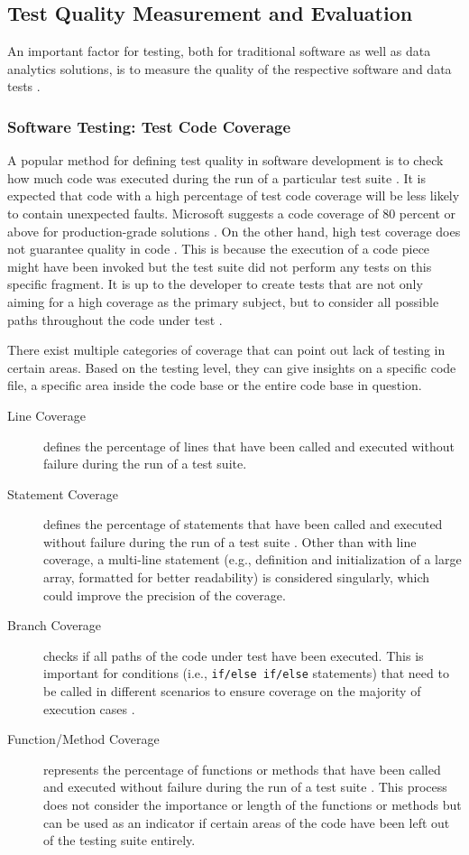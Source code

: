 \subsection{Test Quality Measurement and Evaluation}
An important factor for testing, both for traditional software as well as data analytics solutions, is to measure the quality of the respective software and data tests \cite[30]{Brader2012}.

\subsubsection{Software Testing: Test Code Coverage}
A popular method for defining test quality in software development is to check how much code was executed during the run of a particular test suite \cite[30]{Brader2012}. It is expected that code with a high percentage of test code coverage will be less likely to contain unexpected faults. Microsoft suggests a code coverage of 80 percent or above for production-grade solutions \cite[30]{Brader2012}. On the other hand, high test coverage does not guarantee quality in code \cite[8]{Heckman2014}. This is because the execution of a code piece might have been invoked but the test suite did not perform any tests on this specific fragment. It is up to the developer to create tests that are not only aiming for a high coverage as the primary subject, but to consider all possible paths throughout the code under test \cite[9]{Heckman2014}.

There exist multiple categories of coverage that can point out lack of testing in certain areas. Based on the testing level, they can give insights on a specific code file, a specific area inside the code base or the entire code base in question.

\begin{description}
	\item[Line Coverage] defines the percentage of lines that have been called and executed without failure during the run of a test suite.
	\item[Statement Coverage] defines the percentage of statements that have been called and executed without failure during the run of a test suite \cite[2]{Heckman2014}. Other than with line coverage, a multi-line statement (e.g., definition and initialization of a large array, formatted for better readability) is considered singularly, which could improve the precision of the coverage.
	\item[Branch Coverage] checks if all paths of the code under test have been executed. This is important for conditions (i.e., \texttt{if/else if/else} statements) that need to be called in different scenarios to ensure coverage on the majority of execution cases \cite[2]{Heckman2014}.
	\item[Function/Method Coverage] represents the percentage of functions or methods that have been called and executed without failure during the run of a test suite \cite[2]{Heckman2014}. This process does not consider the importance or length of the functions or methods but can be used as an indicator if certain areas of the code have been left out of the testing suite entirely.
\end{description}
	
